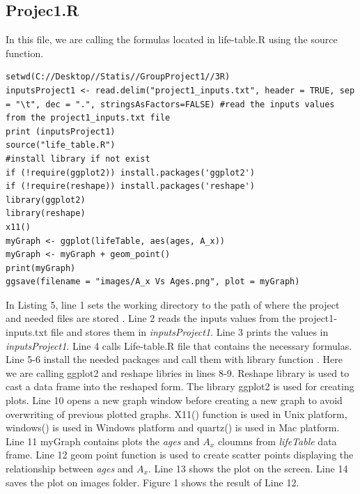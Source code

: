 \documentclass[12pt]{article}
\def\StartLineAtOne{\lstset{firstnumber=1}}
\begin{document}
\subsection{Projec1.R}
\hspace{1 cm}In this file, we are calling the formulas located in life-table.R using the source function.
\StartLineAtOne
\begin{lstlisting}[caption={ The Relationship between $A_{x}$ and Ages},captionpos=b]
setwd(C://Desktop//Statis//GroupProject1//3R)
inputsProject1 <- read.delim("project1_inputs.txt", header = TRUE, sep = "\t", dec = ".", stringsAsFactors=FALSE) #read the inputs values from the project1_inputs.txt file
print (inputsProject1)
source("life_table.R")
#install library if not exist
if (!require(ggplot2)) install.packages('ggplot2')
if (!require(reshape)) install.packages('reshape')
library(ggplot2)
library(reshape)
x11()
myGraph <- ggplot(lifeTable, aes(ages, A_x))
myGraph <- myGraph + geom_point()
print(myGraph)
ggsave(filename = "images/A_x Vs Ages.png", plot = myGraph)
\end{lstlisting}
In Listing 5, line 1 sets the working directory to the path of where the project and needed files are stored . Line 2 reads the inputs values from the project1-inputs.txt file and stores them in \textit{inputsProject1}. Line 3 prints the values in \textit{inputsProject1}. Line 4 calls Life-table.R file that contains the necessary formulas. Line 5-6  install the needed packages and call them with library function . Here we are calling ggplot2 and reshape libries in lines 8-9. Reshape library  is used to cast a data frame into the reshaped form. The library ggplot2 is used for creating plots. Line 10 opens a new graph window before creating a new graph to avoid overwriting of previous plotted graphs. X11() function is used in Unix platform, windows() is used in Windows platform and quartz() is used in Mac platform. Line 11 myGraph contains plots the \textit{ages} and $A_{x}$ cloumns from \textit{lifeTable} data frame. Line 12 geom point function is used to create scatter points displaying the relationship between \textit{ages} and $A_{x}$. Line 13 shows the plot on the screen. Line 14 saves the plot on images folder. Figure 1 shows the result of Line 12.
\end{document}
